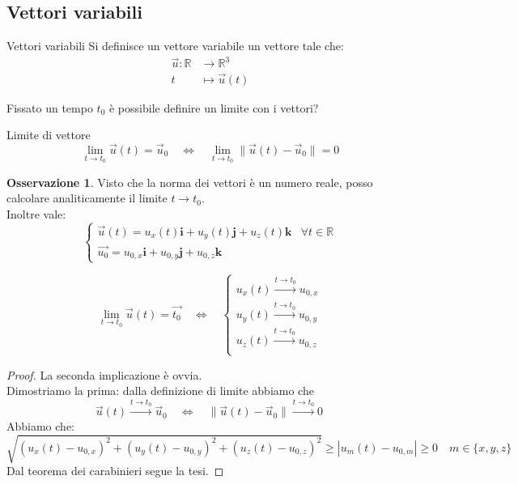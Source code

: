 \documentclass[11pt,a4paper,twoside]{article}
\theoremstyle{definition}
\newtheorem*{oss}{Osservazione}
\begin{document}
\newpage

\subsection{Vettori variabili}

\begin{defn}{Vettori variabili}{}
	Si definisce un vettore variabile un vettore tale che:
		\begin{align*}
			\vec u \colon \mathbb R &\rightarrow \mathbb R^3\\ t &\mapsto \vec u(t)
		\end{align*}
\end{defn}

Fissato un tempo $t_0$ è possibile definire un limite con i vettori?

\begin{defn}{Limite di vettore}{}
	\[
		\lim_{t \to t_0} \vec u(t) = \vec u_0\quad \Leftrightarrow \quad \lim_{t \to t_0} \|\vec u(t) - \vec u_0\| = 0
	\]
\end{defn}

\begin{oss}
	Visto che la norma dei vettori è un numero reale, posso calcolare analiticamente il limite $t \to t_0$.\\
	Inoltre vale:
	\[
		\begin{cases}
			\vec u(t) = u_x(t)\mathbf i + u_y(t)\mathbf j + u_z(t)\mathbf k & \forall t \in \mathbb R\\
			\vec{u_0} = u_{0,x}\mathbf i + u_{0,y}\mathbf j + u_{0,z}\mathbf k
		\end{cases}
	\]
\end{oss}

\begin{prop}{}{}
	\[
		\lim_{t \to t_0} \vec u (t) = \vec {t_0} \quad \Leftrightarrow \quad \begin{cases}
			u_x(t) \xrightarrow{t \to t_0} u_{0,x}\\
			u_y(t) \xrightarrow{t \to t_0} u_{0,y}\\
			u_z(t) \xrightarrow{t \to t_0} u_{0,z}\\
		\end{cases}
	\]
\end{prop}

\begin{proof}
	La seconda implicazione è ovvia.\\
	Dimostriamo la prima: dalla definizione di limite abbiamo che
	\[
		\vec u(t)\xrightarrow{t \to t_0} \vec u_0 \quad \Leftrightarrow \quad \|\vec u(t)-\vec u_0\| \xrightarrow{t \to t_0} 0\
	\]
	Abbiamo che:
	\[
		\sqrt{(u_x(t)-u_{0,x})^2 + (u_y(t)-u_{0,y})^2 + (u_z(t) - u_{0,z})^2}\geq |u_m(t)-u_{0,m}|\geq 0 \quad m \in \{x,y,z\}
	\]
	Dal teorema dei carabinieri segue la tesi.
\end{proof}
\end{document}
